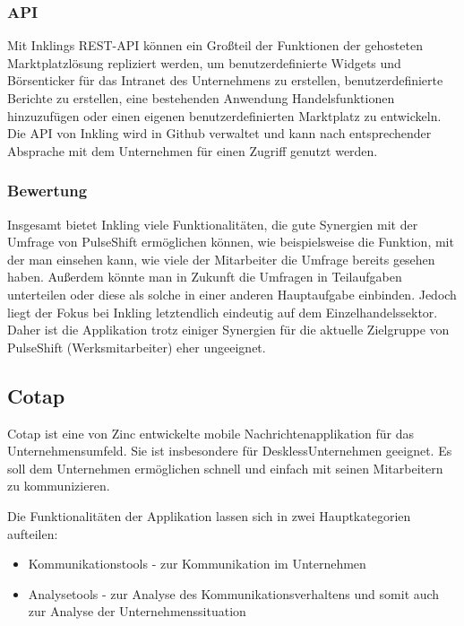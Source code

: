 \subsubsection{API}

Mit Inklings REST-API können ein Großteil der Funktionen der gehosteten Marktplatzlösung repliziert werden, um benutzerdefinierte Widgets und Börsenticker für das Intranet des Unternehmens zu erstellen, benutzerdefinierte Berichte zu erstellen, eine bestehenden Anwendung Handelsfunktionen hinzuzufügen oder einen eigenen benutzerdefinierten Marktplatz zu entwickeln. Die API von Inkling wird in Github verwaltet und kann nach entsprechender Absprache mit dem Unternehmen für einen Zugriff genutzt werden.

\subsubsection{Bewertung}

Insgesamt bietet Inkling viele Funktionalitäten, die gute Synergien mit der Umfrage von PulseShift ermöglichen können, wie beispielsweise die Funktion, mit der man einsehen kann, wie viele der Mitarbeiter die Umfrage bereits gesehen haben. Außerdem könnte man in Zukunft die Umfragen in Teilaufgaben unterteilen oder diese als solche in einer anderen Hauptaufgabe einbinden.
Jedoch liegt der Fokus bei Inkling letztendlich eindeutig auf dem Einzelhandelssektor. Daher ist die Applikation trotz einiger Synergien für die aktuelle Zielgruppe von PulseShift (Werksmitarbeiter) eher ungeeignet.



\subsection{Cotap}
Cotap ist eine von Zinc entwickelte mobile Nachrichtenapplikation für das Unternehmensumfeld. Sie ist insbesondere für \glqq Deskless\grqq Unternehmen geeignet. Es soll dem Unternehmen ermöglichen schnell und einfach mit seinen Mitarbeitern zu kommunizieren. 

Die Funktionalitäten der Applikation lassen sich in zwei Hauptkategorien aufteilen: 

\begin{itemize}
\item Kommunikationstools - zur Kommunikation im Unternehmen 
\item Analysetools - zur Analyse des Kommunikationsverhaltens und somit auch zur Analyse der Unternehmenssituation
\end{itemize}

